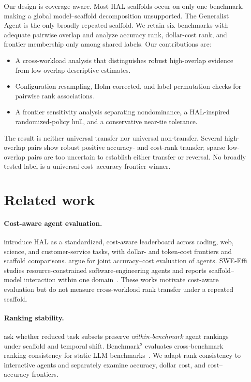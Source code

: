 \documentclass{article}
\begin{document}
Our design is coverage-aware. Most HAL scaffolds occur on only one benchmark, making a global model--scaffold decomposition unsupported. The Generalist Agent is the only broadly repeated scaffold. We retain six benchmarks with adequate pairwise overlap and analyze accuracy rank, dollar-cost rank, and frontier membership only among shared labels. Our contributions are:
\begin{itemize}[leftmargin=*,nosep]
    \item A cross-workload analysis that distinguishes robust high-overlap evidence from low-overlap descriptive estimates.
    \item Configuration-resampling, Holm-corrected, and label-permutation checks for pairwise rank associations.
    \item A frontier sensitivity analysis separating nondominance, a HAL-inspired randomized-policy hull, and a conservative near-tie tolerance.
\end{itemize}

The result is neither universal transfer nor universal non-transfer. Several high-overlap pairs show robust positive accuracy- and cost-rank transfer; sparse low-overlap pairs are too uncertain to establish either transfer or reversal. No broadly tested label is a universal cost--accuracy frontier winner.

\section{Related work}

\paragraph{Cost-aware agent evaluation.}
\citet{kapoor2026hal} introduce HAL as a standardized, cost-aware leaderboard across coding, web, science, and customer-service tasks, with dollar- and token-cost frontiers and scaffold comparisons. \citet{agentsmatter2024} argue for joint accuracy--cost evaluation of agents. SWE-Effi studies resource-constrained software-engineering agents and reports scaffold--model interaction within one domain~\citep{sweeffi2025}. These works motivate cost-aware evaluation but do not measure cross-workload rank transfer under a repeated scaffold.

\paragraph{Ranking stability.}
\citet{ndzomga2026efficient} ask whether reduced task subsets preserve \emph{within-benchmark} agent rankings under scaffold and temporal shift. Benchmark$^2$ evaluates cross-benchmark ranking consistency for static LLM benchmarks~\citep{qian2026benchmark2}. We adapt rank consistency to interactive agents and separately examine accuracy, dollar cost, and cost--accuracy frontiers.
\end{document}
